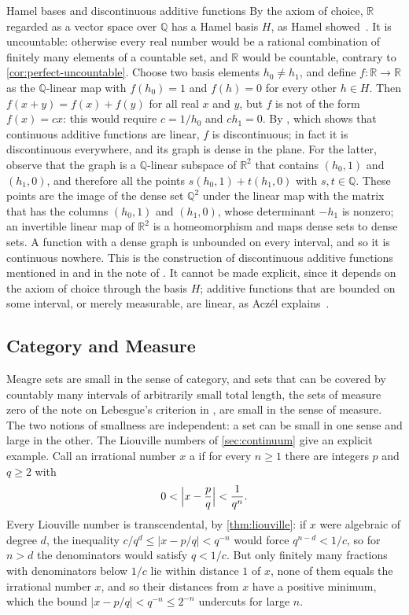 \begin{note}{Hamel bases and discontinuous additive functions}
By the axiom of choice, $\mathbb R$ regarded as a vector space over $\mathbb Q$ has a Hamel basis $H$, as Hamel showed~\cite{hamel1905}. It is uncountable: otherwise every real number would be a rational combination of finitely many elements of a countable set, and $\mathbb R$ would be countable, contrary to \cref{cor:perfect-uncountable}. Choose two basis elements $h_0\ne h_1$, and define $f\colon\mathbb R\to\mathbb R$ as the $\mathbb Q$-linear map with $f(h_0)=1$ and $f(h)=0$ for every other $h\in H$. Then $f(x+y)=f(x)+f(y)$ for all real $x$ and $y$, but $f$ is not of the form $f(x)=cx$: this would require $c=1/h_0$ and $ch_1=0$. By , which shows that continuous additive functions are linear, $f$ is discontinuous; in fact it is discontinuous everywhere, and its graph is dense in the plane. For the latter, observe that the graph is a $\mathbb Q$-linear subspace of $\mathbb R^2$ that contains $(h_0,1)$ and $(h_1,0)$, and therefore all the points $s(h_0,1)+t(h_1,0)$ with $s,t\in\mathbb Q$. These points are the image of the dense set $\mathbb Q^2$ under the linear map with the matrix that has the columns $(h_0,1)$ and $(h_1,0)$, whose determinant $-h_1$ is nonzero; an invertible linear map of $\mathbb R^2$ is a homeomorphism and maps dense sets to dense sets. A function with a dense graph is unbounded on every interval, and so it is continuous nowhere. This is the construction of discontinuous additive functions mentioned in  and in the note of . It cannot be made explicit, since it depends on the axiom of choice through the basis $H$; additive functions that are bounded on some interval, or merely measurable, are linear, as Acz\'el explains~\cite{aczel1966}.
\end{note}

\subsection{Category and Measure}

Meagre sets are small in the sense of category, and sets that can be covered by countably many intervals of arbitrarily small total length, the sets of measure zero of the note on Lebesgue's criterion in , are small in the sense of measure. The two notions of smallness are independent: a set can be small in one sense and large in the other. The Liouville numbers of \cref{sec:continuum} give an explicit example. Call an irrational number $x$ a  if for every $n\ge1$ there are integers $p$ and $q\ge2$ with
\[
0<\Bigl|x-\frac pq\Bigr|<\frac1{q^n} .
\]
Every Liouville number is transcendental, by \cref{thm:liouville}: if $x$ were algebraic of degree $d$, the inequality $c/q^d\le|x-p/q|<q^{-n}$ would force $q^{n-d}<1/c$, so for $n>d$ the denominators would satisfy $q<1/c$. But only finitely many fractions with denominators below $1/c$ lie within distance $1$ of $x$, none of them equals the irrational number $x$, and so their distances from $x$ have a positive minimum, which the bound $|x-p/q|<q^{-n}\le2^{-n}$ undercuts for large $n$.

